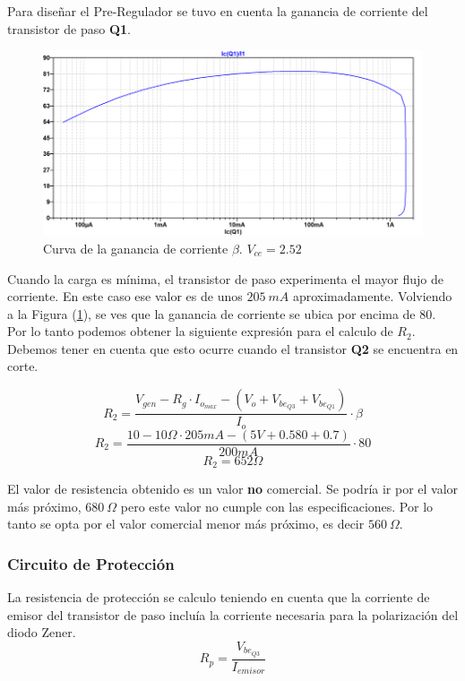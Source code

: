 Para diseñar el Pre-Regulador se tuvo en cuenta la ganancia de corriente del transistor de paso \textbf{Q1}.
\begin{figure}[H]
	\centering
	\includegraphics[width=0.7\linewidth]{ImagenesEjercicio1/BetaTPasoFV}
	\caption{Curva de la ganancia de corriente $\beta$. $V_{ce}=2.52$}
	\label{fig:betatpasofv}
\end{figure}

Cuando la carga es mínima, el transistor de paso experimenta el mayor flujo de corriente. En este caso ese valor es de unos $205\ mA$ aproximadamente. Volviendo a la Figura (\ref{fig:betatpasofv}), se ves que la ganancia de corriente se ubica por encima de $80$. 
Por lo tanto podemos obtener la siguiente expresión para el calculo de $R_2$. Debemos tener en cuenta que esto ocurre cuando el transistor \textbf{Q2} se encuentra en corte.

\begin{equation}
R_{2} = \frac{V_{gen}-R_{g}\cdot I_{o_{max}} - (V_o + V_{be_{Q3}} + V_{be_{Q1}}  )}{I_o} \cdot \beta
\end{equation}
\begin{equation}
R_{2} = \frac{10 - 10 \Omega \cdot 205mA - (5V + 0.580 +0.7)  }{200mA} \cdot 80
\end{equation}
\begin{equation}
R_{2} = 652 \Omega
\end{equation}

El valor de resistencia obtenido es un valor \textbf{no} comercial. Se podría ir por el valor más próximo, $680 \ \Omega$ pero este valor no cumple con las especificaciones. Por lo tanto se opta por el valor comercial menor más próximo, es decir $560 \ \Omega$.

\subsubsection{Circuito de Protección}
La resistencia de protección se calculo teniendo en cuenta que la corriente de emisor del transistor de paso incluía la corriente necesaria para la polarización del diodo Zener. 
\begin{equation}
	R_p = \frac{V_{be_{Q3}}}{I_{emisor}}
\end{equation}

